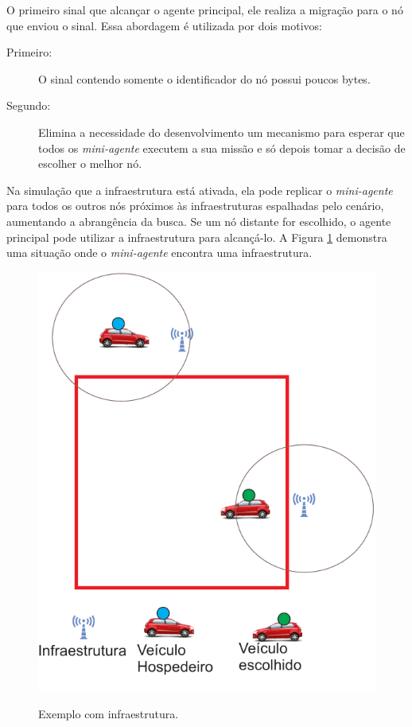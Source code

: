 O primeiro sinal que alcançar o agente principal, ele realiza a migração para o nó que enviou o sinal. Essa abordagem é utilizada por dois motivos:

\begin{description}
	\item[Primeiro:] O sinal contendo somente o identificador do nó possui poucos bytes.
	\item[Segundo:] Elimina a necessidade do desenvolvimento um mecanismo para esperar que todos os \emph{mini-agente} executem a sua missão e só depois tomar a decisão de escolher o melhor nó.
\end{description}

Na simulação que a infraestrutura está ativada, ela pode replicar o \emph{mini-agente} para todos os outros nós próximos 
às infraestruturas espalhadas pelo cenário, aumentando a abrangência da busca. Se um nó distante for escolhido, o agente principal pode utilizar a infraestrutura para alcançá-lo. A Figura \ref{fig:exemploComInfraestrutura} demonstra uma situação onde o \emph{mini-agente} encontra uma infraestrutura.

\begin{figure}[htbp]
	\centering
	\includegraphics[scale=0.5]{metodologia/figuras/exemploComInfraestrutura.pdf}
	\label{fig:exemploComInfraestrutura}
	\caption{Exemplo com infraestrutura.}
\end{figure}


